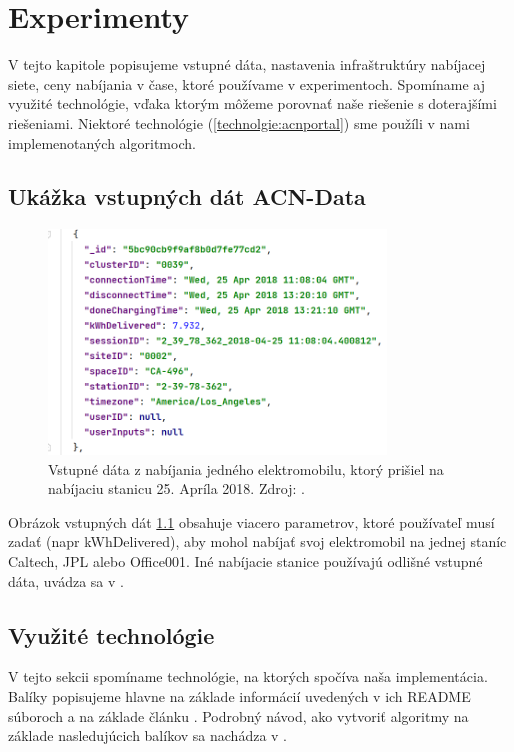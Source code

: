 \chapter{Experimenty}

V tejto kapitole popisujeme vstupné dáta, nastavenia infraštruktúry nabíjacej siete, ceny nabíjania v čase, ktoré používame v experimentoch.
 Spomíname aj využité technológie, vďaka ktorým môžeme porovnať naše riešenie s doterajšími riešeniami. Niektoré technológie (\ref{technolgie:acnportal}) sme použíli v nami implemenotaných algoritmoch.

\section{Ukážka vstupných dát ACN-Data}
\begin{figure}[H]
    \includegraphics[width=0.8\textwidth]{images/acndata.png}
    \centering
    \caption[Ukážka vstupných dát ACN-Data]{Vstupné dáta z nabíjania jedného elektromobilu, ktorý prišiel na nabíjaciu stanicu 25. Apríla 2018. Zdroj: \cite{websiteacndata2023}.}
    \label{acndata:obr}
    \end{figure}
Obrázok vstupných dát \ref{acndata:obr} obsahuje viacero parametrov, ktoré používateľ musí zadať (napr kWhDelivered), aby mohol nabíjať svoj elektromobil na jednej staníc Caltech, JPL alebo Office001. Iné nabíjacie stanice používajú odlišné vstupné dáta, uvádza sa v \cite{lee2021adaptivephd}.

\section{Využité technológie}
V tejto sekcii spomíname technológie, na ktorých spočíva naša implementácia. Balíky popisujeme hlavne na základe informácií uvedených v ich README súboroch a na základe článku \cite{lee2021acnsim}. Podrobný návod, ako vytvoriť algoritmy na základe nasledujúcich balíkov sa nachádza v \cite{lee2021acnsim}.
\label{vychodiska:technologicke}

